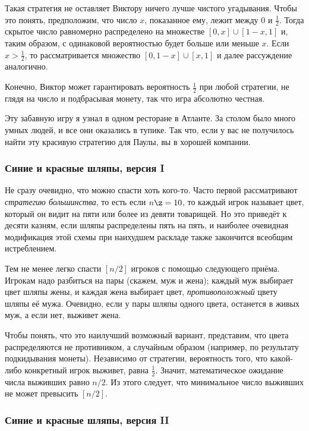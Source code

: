 \documentclass[twoside]{book}
\begin{document}
Такая стратегия не оставляет Виктору ничего лучше чистого угадывания.
Чтобы это понять, предположим, что число $x$, показанное ему, лежит между $0$ и $\tfrac12$.
Тогда скрытое число равномерно распределено на множестве $[0,x]\cup [1-x, 1]$ и, таким образом, с одинаковой вероятностью будет больше или меньше $x$.
Если $x>\tfrac12$, то рассматривается множество $[0, 1-x]\cup [x, 1]$ и далее рассуждение аналогично.

Конечно, Виктор может гарантировать вероятность $\tfrac12$ при любой
стратегии, не глядя на число и подбрасывая монету, так что игра абсолютно честная.
\heart

\medskip
Эту забавную игру я узнал в одном ресторане в Атланте.
За столом было много умных людей, и все они оказались в тупике.
Так что, если у вас не получилось найти эту красивую стратегию для
Паулы, вы в хорошей компании.

\subsubsection*{Синие и красные шляпы, версия I}%

Не сразу очевидно, что можно спасти хоть кого-то.
Часто первой рассматривают \emph{стратегию большинства},
то есть если $n\z=10$, то каждый игрок называет цвет, который он видит на пяти или более из девяти товарищей.
Но это приведёт к десяти казням, если шляпы распределены пять на пять,
и наиболее очевидная модификация этой схемы при наихудшем раскладе
также закончится всеобщим истреблением.

\medskip

Тем не менее легко спасти $[n/2]$ игроков с помощью следующего приёма.
Игрокам надо разбиться на пары (скажем, муж и жена); каждый муж выбирает цвет шляпы жены, и каждая жена выбирает цвет, \emph{противоположный} цвету шляпы её мужа.
Очевидно, если у пары шляпы одного цвета, останется в живых муж, а если нет, выживет жена.

Чтобы понять, что это наилучший возможный вариант, представим, что цвета распределяются не противником, а случайным образом 
(например, по результату подкидывания монеты).
Независимо от стратегии, вероятность того, что какой-либо конкретный игрок выживет, равна $\tfrac12$.
Значит, математическое ожидание числа выживших равно $n/2$. 
Из этого следует, что минимальное число выживших не может превысить $[n/2]$.\heart

\subsubsection*{Синие и красные шляпы, версия II}%
\end{document}
